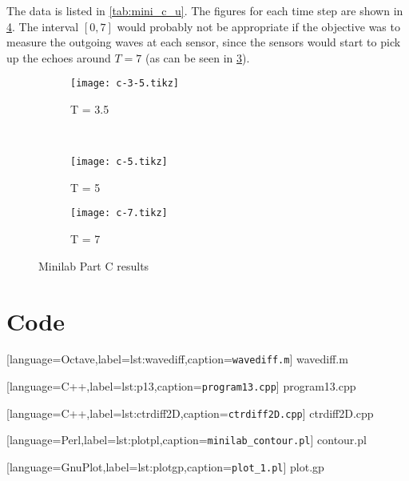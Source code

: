 \documentclass[12pt]{article}
\begin{document}
The data is listed in \cref{tab:mini_c_u}. The figures for each time
step are shown in \cref{fig:mini_c}. The interval $[0,7]$ would
probably not be appropriate if the objective was to measure the
outgoing waves at each sensor, since the sensors would start to pick
up the echoes around $T=7$ (as can be seen in \cref{fig:mini_c_7}).
\begin{figure}[H]
  \centering
  \begin{subfigure}{.5\textwidth}
    \texttt{[image: c-3-5.tikz]}
    \caption{T = 3.5}
    \label{fig:mini_c_3_5}
  \end{subfigure}~
  \begin{subfigure}{.5\textwidth}
    \texttt{[image: c-5.tikz]}
    \caption{T = 5}
    \label{fig:mini_c_5}
  \end{subfigure}
  \begin{subfigure}{\textwidth}
    \texttt{[image: c-7.tikz]}
    \caption{T = 7}
    \label{fig:mini_c_7}
  \end{subfigure}
  \caption{Minilab Part C results}
  \label{fig:mini_c}
\end{figure}
\pagebreak
\section{Code}

[language=Octave,label=lst:wavediff,caption=\texttt{wavediff.m}]
{wavediff.m}
\pagebreak

[language=C++,label=lst:p13,caption=\texttt{program13.cpp}]
{program13.cpp}
\pagebreak

[language=C++,label=lst:ctrdiff2D,caption=\texttt{ctrdiff2D.cpp}]
{ctrdiff2D.cpp}
\pagebreak

[language=Perl,label=lst:plotpl,caption=\texttt{minilab\_contour.pl}]
{contour.pl}
\pagebreak

[language=GnuPlot,label=lst:plotgp,caption=\texttt{plot\_1.pl}]
{plot.gp}
\end{document}
